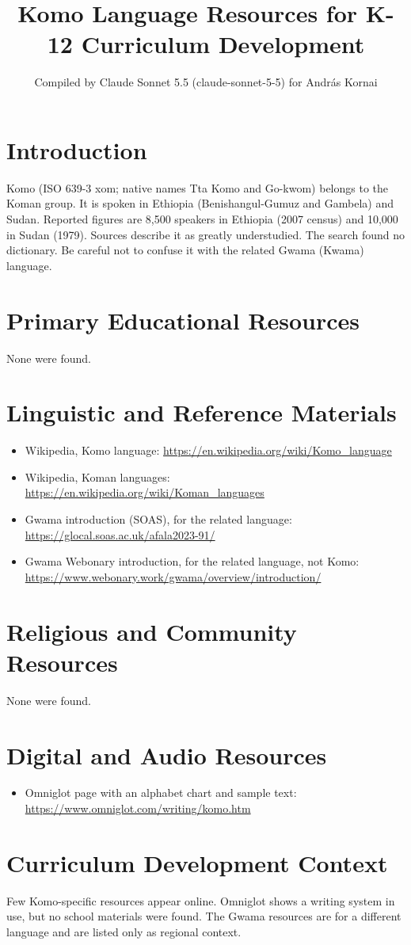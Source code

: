 \documentclass[12pt]{article}
\title{Komo Language Resources for K-12 Curriculum Development}
\author{Compiled by Claude Sonnet 5.5 (claude-sonnet-5-5) for Andr\'as Kornai}
\date{}
\begin{document}
\maketitle

\section{Introduction}
Komo (ISO 639-3 xom; native names Tta Komo and Go-kwom) belongs to the Koman group. It is spoken in Ethiopia (Benishangul-Gumuz and Gambela) and Sudan. Reported figures are 8,500 speakers in Ethiopia (2007 census) and 10,000 in Sudan (1979). Sources describe it as greatly understudied. The search found no dictionary. Be careful not to confuse it with the related Gwama (Kwama) language.

\section{Primary Educational Resources}
None were found.

\section{Linguistic and Reference Materials}
\begin{itemize}
\item Wikipedia, Komo language: \url{https://en.wikipedia.org/wiki/Komo_language}
\item Wikipedia, Koman languages: \url{https://en.wikipedia.org/wiki/Koman_languages}
\item Gwama introduction (SOAS), for the related language: \url{https://glocal.soas.ac.uk/afala2023-91/}
\item Gwama Webonary introduction, for the related language, not Komo: \url{https://www.webonary.work/gwama/overview/introduction/}
\end{itemize}

\section{Religious and Community Resources}
None were found.

\section{Digital and Audio Resources}
\begin{itemize}
\item Omniglot page with an alphabet chart and sample text: \url{https://www.omniglot.com/writing/komo.htm}
\end{itemize}

\section{Curriculum Development Context}
Few Komo-specific resources appear online. Omniglot shows a writing system in use, but no school materials were found. The Gwama resources are for a different language and are listed only as regional context.
\end{document}
